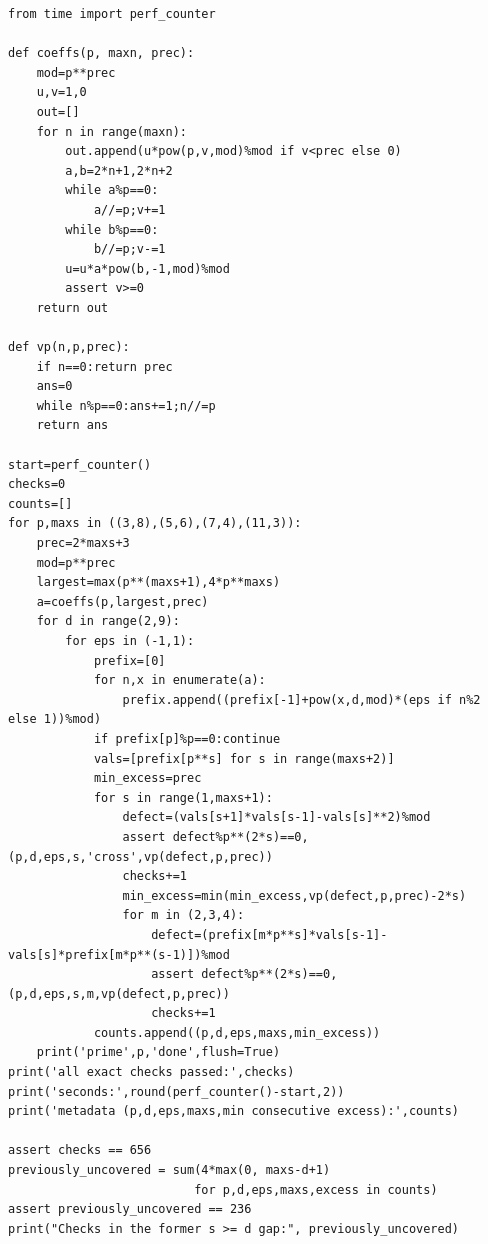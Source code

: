 \documentclass[11pt,letterpaper]{article}
\theoremstyle{definition}
\theoremstyle{remark}
\begin{document}
\begin{lstlisting}
from time import perf_counter

def coeffs(p, maxn, prec):
    mod=p**prec
    u,v=1,0
    out=[]
    for n in range(maxn):
        out.append(u*pow(p,v,mod)%mod if v<prec else 0)
        a,b=2*n+1,2*n+2
        while a%p==0:
            a//=p;v+=1
        while b%p==0:
            b//=p;v-=1
        u=u*a*pow(b,-1,mod)%mod
        assert v>=0
    return out

def vp(n,p,prec):
    if n==0:return prec
    ans=0
    while n%p==0:ans+=1;n//=p
    return ans

start=perf_counter()
checks=0
counts=[]
for p,maxs in ((3,8),(5,6),(7,4),(11,3)):
    prec=2*maxs+3
    mod=p**prec
    largest=max(p**(maxs+1),4*p**maxs)
    a=coeffs(p,largest,prec)
    for d in range(2,9):
        for eps in (-1,1):
            prefix=[0]
            for n,x in enumerate(a):
                prefix.append((prefix[-1]+pow(x,d,mod)*(eps if n%2 else 1))%mod)
            if prefix[p]%p==0:continue
            vals=[prefix[p**s] for s in range(maxs+2)]
            min_excess=prec
            for s in range(1,maxs+1):
                defect=(vals[s+1]*vals[s-1]-vals[s]**2)%mod
                assert defect%p**(2*s)==0,(p,d,eps,s,'cross',vp(defect,p,prec))
                checks+=1
                min_excess=min(min_excess,vp(defect,p,prec)-2*s)
                for m in (2,3,4):
                    defect=(prefix[m*p**s]*vals[s-1]-vals[s]*prefix[m*p**(s-1)])%mod
                    assert defect%p**(2*s)==0,(p,d,eps,s,m,vp(defect,p,prec))
                    checks+=1
            counts.append((p,d,eps,maxs,min_excess))
    print('prime',p,'done',flush=True)
print('all exact checks passed:',checks)
print('seconds:',round(perf_counter()-start,2))
print('metadata (p,d,eps,maxs,min consecutive excess):',counts)

assert checks == 656
previously_uncovered = sum(4*max(0, maxs-d+1)
                          for p,d,eps,maxs,excess in counts)
assert previously_uncovered == 236
print("Checks in the former s >= d gap:", previously_uncovered)

\end{lstlisting}



\clearpage\endgroup



\begingroup
\newcommand{\Z}{\mathbb Z}
\newcommand{\Q}{\mathbb Q}
\newcommand{\C}{\mathbb C}
\newcommand{\F}{\mathbb F}
\newcommand{\Zp}{\mathbb Z_p}
\newcommand{\Qp}{\mathbb Q_p}
\newcommand{\Gal}{\operatorname{Gal}}
\newcommand{\Frob}{\operatorname{Frob}}
\newcommand{\ord}{\operatorname{ord}}
\newcommand{\Sym}{\operatorname{Sym}}
\newcommand{\Fil}{\operatorname{Fil}}
\newcommand{\Span}{\operatorname{span}}
\newcommand{\AESZ}{\mathrm{AESZ}}
\newcommand{\PF}{\mathcal L}
\newcommand{\eps}{\varepsilon}
\newcommand{\vp}{v_p}
\end{document}

